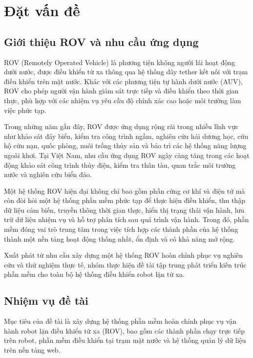 \documentclass[../DoAn.tex]{subfiles}
\begin{document}
\section{Đặt vấn đề}
\label{section:1.1}

\subsection{Giới thiệu ROV và nhu cầu ứng dụng}
\label{subsection:1.1.1}

ROV (Remotely Operated Vehicle) là phương tiện không người lái hoạt động dưới nước, được điều khiển từ xa thông qua hệ thống dây tether kết nối với trạm điều khiển trên mặt nước. Khác với các phương tiện tự hành dưới nước (AUV), ROV cho phép người vận hành giám sát trực tiếp và điều khiển theo thời gian thực, phù hợp với các nhiệm vụ yêu cầu độ chính xác cao hoặc môi trường làm việc phức tạp.

Trong những năm gần đây, ROV được ứng dụng rộng rãi trong nhiều lĩnh vực như khảo sát đáy biển, kiểm tra công trình ngầm, nghiên cứu hải dương học, cứu hộ cứu nạn, quốc phòng, nuôi trồng thủy sản và bảo trì các hệ thống năng lượng ngoài khơi. Tại Việt Nam, nhu cầu ứng dụng ROV ngày càng tăng trong các hoạt động khảo sát công trình thủy điện, kiểm tra thân tàu, quan trắc môi trường nước và nghiên cứu biển đảo.

Một hệ thống ROV hiện đại không chỉ bao gồm phần cứng cơ khí và điện tử mà còn đòi hỏi một hệ thống phần mềm phức tạp để thực hiện điều khiển, thu thập dữ liệu cảm biến, truyền thông thời gian thực, hiển thị trạng thái vận hành, lưu trữ dữ liệu nhiệm vụ và hỗ trợ phân tích sau quá trình vận hành. Trong đó, phần mềm đóng vai trò trung tâm trong việc tích hợp các thành phần của hệ thống thành một nền tảng hoạt động thống nhất, ổn định và có khả năng mở rộng.

Xuất phát từ nhu cầu xây dựng một hệ thống ROV hoàn chỉnh phục vụ nghiên cứu và thử nghiệm thực tế, nhóm thực hiện đề tài tập trung phát triển kiến trúc phần mềm cho toàn bộ hệ thống điều khiển robot lặn từ xa.

\subsection{Nhiệm vụ đề tài}
\label{subsection:1.1.2}

Mục tiêu của đề tài là xây dựng hệ thống phần mềm hoàn chỉnh phục vụ vận hành robot lặn điều khiển từ xa (ROV), bao gồm các thành phần chạy trực tiếp trên robot, phần mềm điều khiển tại trạm mặt nước và hệ thống quản lý dữ liệu trên nền tảng web.
\end{document}
